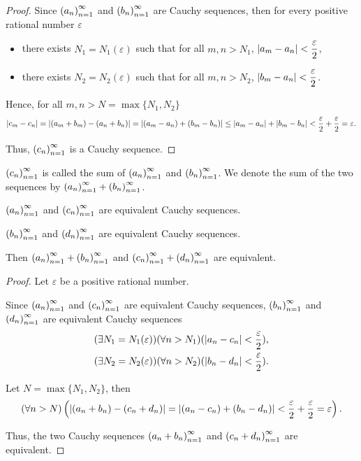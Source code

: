 \begin{proof}
    Since ${\left({a_{n}}\right)}^{\infty}_{n=1}$ and ${\left({b_{n}}\right)}^{\infty}_{n=1}$ are Cauchy sequences, then for every positive rational number $\varepsilon$
    \begin{itemize}[itemsep=0pt]
        \item there exists $N_{1} = N_{1}(\varepsilon)$ such that for all $m, n > N_{1}$, $\left\vert{a_{m} - a_{n}}\right\vert < \dfrac{\varepsilon}{2}$,
        \item there exists $N_{2} = N_{2}(\varepsilon)$ such that for all $m, n > N_{2}$, $\left\vert{b_{m} - a_{n}}\right\vert < \dfrac{\varepsilon}{2}$.
    \end{itemize}

    Hence, for all $m, n > N = \max\{N_{1}, N_{2}\}$
    \[
        \left\vert{c_{m} - c_{n}}\right\vert = \left\vert{(a_{m} + b_{m}) - (a_{n} + b_{n})}\right\vert = \left\vert{(a_{m} - a_{n}) + (b_{m} - b_{n})}\right\vert\le \left\vert{a_{m} - a_{n}}\right\vert + \left\vert{b_{m} - b_{n}}\right\vert < \frac{\varepsilon}{2} + \frac{\varepsilon}{2} = \varepsilon.
    \]

    Thus, ${\left({c_{n}}\right)}^{\infty}_{n=1}$ is a Cauchy sequence.
\end{proof}

${\left({c_{n}}\right)}^{\infty}_{n=1}$ is called the sum of ${\left({a_{n}}\right)}^{\infty}_{n=1}$ and ${\left({b_{n}}\right)}^{\infty}_{n=1}$. We denote the sum of the two sequences by ${\left({a_{n}}\right)}^{\infty}_{n=1} + {\left({b_{n}}\right)}^{\infty}_{n=1}$.

\begin{theorem}
    ${\left({a_{n}}\right)}^{\infty}_{n=1}$ and ${\left({c_{n}}\right)}^{\infty}_{n=1}$ are equivalent Cauchy sequences.

    ${\left({b_{n}}\right)}^{\infty}_{n=1}$ and ${\left({d_{n}}\right)}^{\infty}_{n=1}$ are equivalent Cauchy sequences.

    Then ${\left({a_{n}}\right)}^{\infty}_{n=1} + {\left({b_{n}}\right)}^{\infty}_{n=1}$ and ${\left({c_{n}}\right)}^{\infty}_{n=1} + {\left({d_{n}}\right)}^{\infty}_{n=1}$ are equivalent.
\end{theorem}

\begin{proof}
    Let $\varepsilon$ be a positive rational number.

    Since ${\left({a_{n}}\right)}^{\infty}_{n=1}$ and ${\left({c_{n}}\right)}^{\infty}_{n=1}$ are equivalent Cauchy sequences, ${\left({b_{n}}\right)}^{\infty}_{n=1}$ and ${\left({d_{n}}\right)}^{\infty}_{n=1}$ are equivalent Cauchy sequences
    \[
        \begin{split}
            (\exists N_{1} = N_{1}(\varepsilon))(\forall n > N_{1})(\left\vert{a_{n} - c_{n}}\right\vert < \frac{\varepsilon}{2}), \\
            (\exists N_{2} = N_{2}(\varepsilon))(\forall n > N_{2})(\left\vert{b_{n} - d_{n}}\right\vert < \frac{\varepsilon}{2}).
        \end{split}
    \]

    Let $N = \max\{ N_{1}, N_{2} \}$, then
    \[
        (\forall n > N)\left(\left\vert{(a_{n} + b_{n}) - (c_{n} + d_{n})}\right\vert = \left\vert{(a_{n} - c_{n}) + (b_{n} - d_{n})}\right\vert < \frac{\varepsilon}{2} + \frac{\varepsilon}{2} = \varepsilon\right).
    \]

    Thus, the two Cauchy sequences ${\left({a_{n} + b_{n}}\right)}^{\infty}_{n=1}$ and ${\left({c_{n} + d_{n}}\right)}^{\infty}_{n=1}$ are equivalent.
\end{proof}

